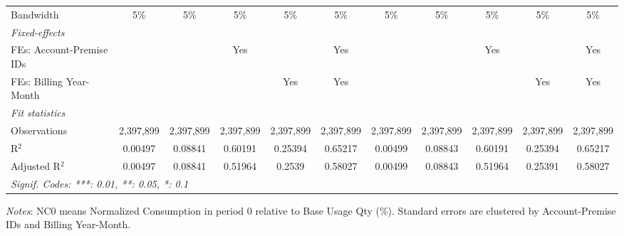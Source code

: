 \begin{table}[htbp]
\begin{adjustbox}{scale = 0.75}
\begin{tabular}{lcccccccccc}
& & & & & & & & & & \\
\midrule Bandwidth & 5\% & 5\% & 5\% & 5\% & 5\% & 5\% & 5\% & 5\% & 5\% & 5\%\\
\midrule
\emph{Fixed-effects}&   &   &   &   &   &   &   &   &   &  \\
FEs: Account-Premise IDs &  &  & Yes &  & Yes &  &  & Yes &  & Yes\\
FEs: Billing Year-Month &  &  &  & Yes & Yes &  &  &  & Yes & Yes\\
\midrule
\emph{Fit statistics}&  & & & & & & & & & \\
Observations & 2,397,899&2,397,899&2,397,899&2,397,899&2,397,899&2,397,899&2,397,899&2,397,899&2,397,899&2,397,899\\
R$^2$ & 0.00497&0.08841&0.60191&0.25394&0.65217&0.00499&0.08843&0.60191&0.25394&0.65217\\
Adjusted R$^2$ & 0.00497&0.08841&0.51964&0.2539&0.58027&0.00499&0.08843&0.51964&0.25391&0.58027\\
\bottomrule\bottomrule
\multicolumn{11}{l}{\emph{Signif. Codes: ***: 0.01, **: 0.05, *: 0.1}}\\
\end{tabular}
\end{adjustbox}
\begin{tablenotes}
\footnotesize
\emph{\medskip Notes}: NC0 means Normalized Consumption in period 0 relative to Base Usage Qty (\%). Standard errors are clustered by Account-Premise IDs and Billing Year-Month.
\end{tablenotes}
\end{table}